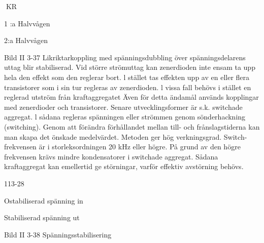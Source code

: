 KR

1 :a Halvvågen

2:a Halvvågen

Bild II 3-37 Likriktarkoppling med spänningsdubbling
över spänningsdelarens uttag blir stabiliserad. Vid större strömuttag kan zenerdioden
inte ensam ta upp hela den effekt som den
reglerar bort. l stället tas effekten upp av en
eller flera transistorer som i sin tur regleras
av zenerdioden.
l vissa fall behövs i stället en reglerad
utström från kraftaggregatet Även för detta
ändamål används kopplingar med zenerdioder och transistorer.
Senare utvecklingsformer är s.k. switchade aggregat. l sådana regleras spänningen eller strömmen genom sönderhackning (switching). Genom att förändra förhållandet mellan till- och frånslagstiderna kan
man skapa det önskade medelvärdet. Metoden ger hög verkningsgrad. Switch-frekvensen är i storleksordningen 20 kHz eller högre. På grund av den högre frekvensen
krävs mindre kondensatorer i switchade
aggregat. Sådana kraftaggregat kan emellertid ge störningar, varför effektiv avstörning behövs.

113-28

Ostabiliserad
spänning in

Stabiliserad
spänning ut

Bild II 3-38 Spänningsstabilisering

